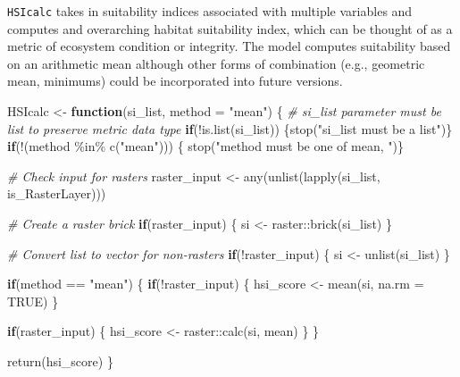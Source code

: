 \documentclass[
]{book}
\newenvironment{Shaded}{\begin{snugshade}}{\end{snugshade}}
\newcommand{\AttributeTok}[1]{\textcolor[rgb]{0.77,0.63,0.00}{#1}}
\newcommand{\CommentTok}[1]{\textcolor[rgb]{0.56,0.35,0.01}{\textit{#1}}}
\newcommand{\ConstantTok}[1]{\textcolor[rgb]{0.00,0.00,0.00}{#1}}
\newcommand{\ControlFlowTok}[1]{\textcolor[rgb]{0.13,0.29,0.53}{\textbf{#1}}}
\newcommand{\FunctionTok}[1]{\textcolor[rgb]{0.00,0.00,0.00}{#1}}
\newcommand{\NormalTok}[1]{#1}
\newcommand{\OtherTok}[1]{\textcolor[rgb]{0.56,0.35,0.01}{#1}}
\newcommand{\SpecialCharTok}[1]{\textcolor[rgb]{0.00,0.00,0.00}{#1}}
\newcommand{\StringTok}[1]{\textcolor[rgb]{0.31,0.60,0.02}{#1}}
\begin{document}
\texttt{HSIcalc} takes in suitability indices associated with multiple variables and computes and overarching habitat suitability index, which can be thought of as a metric of ecosystem condition or integrity. The model computes suitability based on an arithmetic mean although other forms of combination (e.g., geometric mean, minimums) could be incorporated into future versions.

\begin{Shaded}
\begin{Highlighting}[]
\NormalTok{HSIcalc }\OtherTok{\textless{}{-}} \ControlFlowTok{function}\NormalTok{(si\_list, }\AttributeTok{method =} \StringTok{"mean"}\NormalTok{) \{}
  \CommentTok{\# si\_list parameter must be list to preserve metric data type}
  \ControlFlowTok{if}\NormalTok{(}\SpecialCharTok{!}\FunctionTok{is.list}\NormalTok{(si\_list)) \{}\FunctionTok{stop}\NormalTok{(}\StringTok{"si\_list must be a list"}\NormalTok{)\}}
  \ControlFlowTok{if}\NormalTok{(}\SpecialCharTok{!}\NormalTok{(method }\SpecialCharTok{\%in\%} \FunctionTok{c}\NormalTok{(}\StringTok{"mean"}\NormalTok{))) \{}
    \FunctionTok{stop}\NormalTok{(}\StringTok{"method must be one of \textquotesingle{}mean\textquotesingle{}, "}\NormalTok{)\}}

  \CommentTok{\# Check input for rasters}
\NormalTok{  raster\_input }\OtherTok{\textless{}{-}} \FunctionTok{any}\NormalTok{(}\FunctionTok{unlist}\NormalTok{(}\FunctionTok{lapply}\NormalTok{(si\_list, is\_RasterLayer)))}

  \CommentTok{\# Create a raster brick}
  \ControlFlowTok{if}\NormalTok{(raster\_input) \{}
\NormalTok{    si }\OtherTok{\textless{}{-}}\NormalTok{ raster}\SpecialCharTok{::}\FunctionTok{brick}\NormalTok{(si\_list)}
\NormalTok{  \}}

  \CommentTok{\# Convert list to vector for non{-}rasters}
  \ControlFlowTok{if}\NormalTok{(}\SpecialCharTok{!}\NormalTok{raster\_input) \{}
\NormalTok{    si }\OtherTok{\textless{}{-}} \FunctionTok{unlist}\NormalTok{(si\_list)}
\NormalTok{  \}}

  \ControlFlowTok{if}\NormalTok{(method }\SpecialCharTok{==} \StringTok{"mean"}\NormalTok{) \{}
    \ControlFlowTok{if}\NormalTok{(}\SpecialCharTok{!}\NormalTok{raster\_input) \{}
\NormalTok{      hsi\_score }\OtherTok{\textless{}{-}} \FunctionTok{mean}\NormalTok{(si, }\AttributeTok{na.rm =} \ConstantTok{TRUE}\NormalTok{)}
\NormalTok{    \}}

    \ControlFlowTok{if}\NormalTok{(raster\_input) \{}
\NormalTok{      hsi\_score }\OtherTok{\textless{}{-}}\NormalTok{ raster}\SpecialCharTok{::}\FunctionTok{calc}\NormalTok{(si, mean)}
\NormalTok{    \}}
\NormalTok{  \}}

  \FunctionTok{return}\NormalTok{(hsi\_score)}
\NormalTok{\}}
\end{Highlighting}
\end{Shaded}
\end{document}
